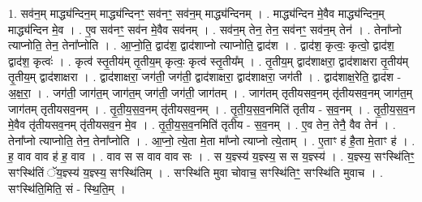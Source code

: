 \documentclass[17pt]{extarticle}
\begin{document}
1. सव॑न॒म् माद्ध्य॑न्दिन॒म् माद्ध्य॑न्दिनꣳ॒॒ सव॑नꣳ॒॒ सव॑न॒म् माद्ध्य॑न्दिनम् । . माद्ध्य॑न्दिन मे॒वैव माद्ध्य॑न्दिन॒म् माद्ध्य॑न्दिन मे॒व । . ए॒व सव॑नꣳ॒॒ सव॑न मे॒वैव सव॑नम् । . सव॑न॒म् तेन॒ तेन॒ सव॑नꣳ॒॒ सव॑न॒म् तेन॑ । . तेना᳚प्नो त्याप्नोति॒ तेन॒ तेना᳚प्नोति । . आ॒प्नो॒ति॒ द्वाद॑श॒ द्वाद॑शाप्नो त्याप्नोति॒ द्वाद॑श । . द्वाद॑श॒ कृत्वः॒ कृत्वो॒ द्वाद॑श॒ द्वाद॑श॒ कृत्वः॑ । . कृत्व॑ स्तृ॒तीय॑म् तृ॒तीय॒म् कृत्वः॒ कृत्व॑ स्तृ॒तीय᳚म् । . तृ॒तीय॒म् द्वाद॑शाक्षरा॒ द्वाद॑शाक्षरा तृ॒तीय॑म् तृ॒तीय॒म् द्वाद॑शाक्षरा । . द्वाद॑शाक्षरा॒ जग॑ती॒ जग॑ती॒ द्वाद॑शाक्षरा॒ द्वाद॑शाक्षरा॒ जग॑ती । . द्वाद॑शाक्ष॒रेति॒ द्वाद॑श - अ॒क्ष॒रा॒ । . जग॑ती॒ जाग॑त॒म् जाग॑त॒म् जग॑ती॒ जग॑ती॒ जाग॑तम् । . जाग॑तम् तृतीयसव॒नम् तृ॑तीयसव॒नम् जाग॑त॒म् जाग॑तम् तृतीयसव॒नम् । . तृ॒ती॒य॒स॒व॒नम् तृ॑तीयसव॒नम् । . तृ॒ती॒य॒स॒व॒नमिति॑ तृतीय - स॒व॒नम् । . तृ॒ती॒य॒स॒व॒न मे॒वैव तृ॑तीयसव॒नम् तृ॑तीयसव॒न मे॒व । . तृ॒ती॒य॒स॒व॒नमिति॑ तृतीय - स॒व॒नम् । . ए॒व तेन॒ तेनै॒ वैव तेन॑ । . तेना᳚प्नो त्याप्नोति॒ तेन॒ तेना᳚प्नोति । . आ॒प्नो॒ त्ये॒ता मे॒ता मा᳚प्नो त्याप्नो त्ये॒ताम् । . ए॒ताꣳ ह॑ है॒ता मे॒ताꣳ ह॑ । . ह॒ वाव वाव ह॑ ह॒ वाव । . वाव स स वाव वाव सः । . स य॒ज्ञ्स्य॑ य॒ज्ञ्स्य॒ स स य॒ज्ञ्स्य॑ । . य॒ज्ञ्स्य॒ सꣳस्थि॑तिꣳ॒॒ सꣳस्थि॑तिं ॅय॒ज्ञ्स्य॑ य॒ज्ञ्स्य॒ सꣳस्थि॑तिम् । . सꣳस्थि॑ति मुवा चोवाच॒ सꣳस्थि॑तिꣳ॒॒ सꣳस्थि॑ति मुवाच । . सꣳस्थि॑ति॒मिति॒ सं - स्थि॒ति॒म् । \newline
\end{document}
